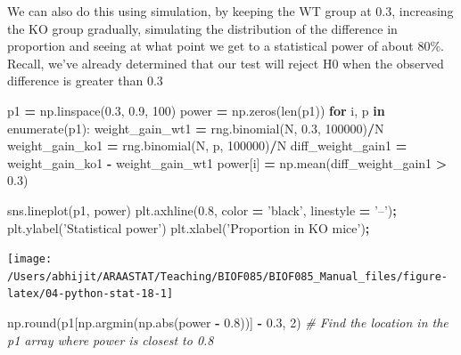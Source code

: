 \documentclass[
  letterpaper,
]{scrbook}
\newenvironment{Shaded}{\begin{snugshade}}{\end{snugshade}}
\newcommand{\BuiltInTok}[1]{#1}
\newcommand{\CommentTok}[1]{\textcolor[rgb]{0.56,0.35,0.01}{\textit{#1}}}
\newcommand{\ControlFlowTok}[1]{\textcolor[rgb]{0.13,0.29,0.53}{\textbf{#1}}}
\newcommand{\DecValTok}[1]{\textcolor[rgb]{0.00,0.00,0.81}{#1}}
\newcommand{\FloatTok}[1]{\textcolor[rgb]{0.00,0.00,0.81}{#1}}
\newcommand{\KeywordTok}[1]{\textcolor[rgb]{0.13,0.29,0.53}{\textbf{#1}}}
\newcommand{\NormalTok}[1]{#1}
\newcommand{\OperatorTok}[1]{\textcolor[rgb]{0.81,0.36,0.00}{\textbf{#1}}}
\newcommand{\StringTok}[1]{\textcolor[rgb]{0.31,0.60,0.02}{#1}}
\begin{document}
We can also do this using simulation, by keeping the WT group at 0.3, increasing the KO group gradually, simulating the distribution of the difference in proportion and seeing at what point we get to a statistical power of about 80\%. Recall, we've already determined that our test will reject H0 when the observed difference is greater than 0.3

\begin{Shaded}
\begin{Highlighting}[]
\NormalTok{p1 }\OperatorTok{=}\NormalTok{ np.linspace(}\FloatTok{0.3}\NormalTok{, }\FloatTok{0.9}\NormalTok{, }\DecValTok{100}\NormalTok{)}
\NormalTok{power }\OperatorTok{=}\NormalTok{ np.zeros(}\BuiltInTok{len}\NormalTok{(p1))}
\ControlFlowTok{for}\NormalTok{ i, p }\KeywordTok{in} \BuiltInTok{enumerate}\NormalTok{(p1):}
\NormalTok{    weight_gain_wt1 }\OperatorTok{=}\NormalTok{ rng.binomial(N, }\FloatTok{0.3}\NormalTok{, }\DecValTok{100000}\NormalTok{)}\OperatorTok{/}\NormalTok{N}
\NormalTok{    weight_gain_ko1 }\OperatorTok{=}\NormalTok{ rng.binomial(N, p, }\DecValTok{100000}\NormalTok{)}\OperatorTok{/}\NormalTok{N}
\NormalTok{    diff_weight_gain1 }\OperatorTok{=}\NormalTok{ weight_gain_ko1 }\OperatorTok{-}\NormalTok{ weight_gain_wt1}
\NormalTok{    power[i] }\OperatorTok{=}\NormalTok{ np.mean(diff_weight_gain1 }\OperatorTok{>} \FloatTok{0.3}\NormalTok{)}
\end{Highlighting}
\end{Shaded}

\begin{Shaded}
\begin{Highlighting}[]
\NormalTok{sns.lineplot(p1, power)}
\NormalTok{plt.axhline(}\FloatTok{0.8}\NormalTok{, color }\OperatorTok{=} \StringTok{'black'}\NormalTok{, linestyle }\OperatorTok{=} \StringTok{'--'}\NormalTok{)}\OperatorTok{;}
\NormalTok{plt.ylabel(}\StringTok{'Statistical power'}\NormalTok{)}
\NormalTok{plt.xlabel(}\StringTok{'Proportion in KO mice'}\NormalTok{)}\OperatorTok{;}
\end{Highlighting}
\end{Shaded}

\begin{center}\texttt{[image: /Users/abhijit/ARAASTAT/Teaching/BIOF085/BIOF085\_Manual\_files/figure-latex/04-python-stat-18-1]} \end{center}

\begin{Shaded}
\begin{Highlighting}[]
\NormalTok{np.}\BuiltInTok{round}\NormalTok{(p1[np.argmin(np.}\BuiltInTok{abs}\NormalTok{(power }\OperatorTok{-} \FloatTok{0.8}\NormalTok{))] }\OperatorTok{-} \FloatTok{0.3}\NormalTok{, }\DecValTok{2}\NormalTok{) }\CommentTok{# Find the location in the p1 array where power is closest to 0.8}
\end{Highlighting}
\end{Shaded}
\end{document}
